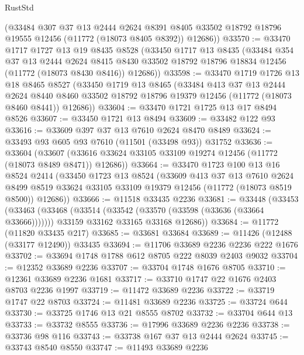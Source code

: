 \begin{lexlean}{RustStd}
\begin{coremodule}
      (@33484
        @307
        @37
        @13
        @2444
        @2624
        @8391
        @8405
        @33502
        @18792
        @18796
        @19555
        @12456
        (@11772 (@18073 @8405 @8392))
        @12686))
@33570 := @33470
    @1717
    @1727
    @13
    @19
    @8435
    @8528
    (@33450
      @1717
      @13
      @8435
      (@33484
        @354
        @37
        @13
        @2444
        @2624
        @8415
        @8430
        @33502
        @18792
        @18796
        @18834
        @12456
        (@11772 (@18073 @8430 @8416))
        @12686))
@33598 := @33470
    @1719
    @1726
    @13
    @18
    @8465
    @8527
    (@33450
      @1719
      @13
      @8465
      (@33484
        @413
        @37
        @13
        @2444
        @2624
        @8440
        @8460
        @33502
        @18792
        @18796
        @19379
        @12456
        (@11772 (@18073 @8460 @8441))
        @12686))
@33604 := @33470 @1721 @1725 @13 @17 @8494 @8526
@33607 := @33450 @1721 @13 @8494
@33609 := @33482 @122 @93
@33616 := @33609 @397 @37 @13 @7610 @2624 @8470 @8489
@33624 := @33493 @93 @605 @93 @7610 (@11501 (@33498 @93)) @31752
@33636 := @33604
    (@33607 (@33616 @33624 @33105 @33109 @19274 @12456 (@11772 (@18073 @8489 @8471)) @12686))
@33664 := @33470
    @1723
    @100
    @13
    @16
    @8524
    @2414
    (@33450
      @1723
      @13
      @8524
      (@33609
        @413
        @37
        @13
        @7610
        @2624
        @8499
        @8519
        @33624
        @33105
        @33109
        @19379
        @12456
        (@11772 (@18073 @8519 @8500))
        @12686))
@33666 := @11518 @33435 @2236
@33681 := @33448
    (@33453
      (@33463
        (@33468 (@33514 (@33542 (@33570 (@33598 (@33636 (@33664 @33666)))))))
        @33159
        @33162
        @33165
        @33168
        @12686))
@33684 := @11772 (@11820 @33435 @217)
@33685 := @33681 @33684
@33689 := @11426 (@12488 (@33177 @12490)) @33435
@33694 := @11706 @33689 @2236 @2236 @222 @1676
@33702 := @33694 @1748 @1788 @612 @8705 @222 @8039 @2403 @9032
@33704 := @12352 @33689 @2236
@33707 := @33704 @1748 @1676 @8705
@33710 := @12361 @33689 @2236 @1681
@33717 := @33710 @1747 @22 @1676 @2403 @8703 @2236 @1997
@33719 := @11472 @33689 @2236
@33722 := @33719 @1747 @22 @8703
@33724 := @11481 @33689 @2236
@33725 := @33724 @644
@33730 := @33725 @1746 @13 @21 @8555 @8702
@33732 := @33704 @644 @13
@33733 := @33732 @8555
@33736 := @17996 @33689 @2236 @2236
@33738 := @33736 @98 @116
@33743 := @33738 @167 @37 @13 @2444 @2624
@33745 := @33743 @8540 @8550
@33747 := @11493 @33689 @2236

\end{coremodule}
\end{lexlean}
